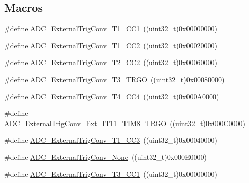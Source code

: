 \subsection*{Macros}
\begin{DoxyCompactItemize}
\item 
\#define \hyperlink{group___a_d_c__external__trigger__sources__for__regular__channels__conversion_ga303f24361ea930f8214e9e68b63b244e}{A\+D\+C\+\_\+\+External\+Trig\+Conv\+\_\+\+T1\+\_\+\+C\+C1}~((uint32\+\_\+t)0x00000000)
\item 
\#define \hyperlink{group___a_d_c__external__trigger__sources__for__regular__channels__conversion_ga8bf9fd9ad4e4c12ef41520ded2c3c332}{A\+D\+C\+\_\+\+External\+Trig\+Conv\+\_\+\+T1\+\_\+\+C\+C2}~((uint32\+\_\+t)0x00020000)
\item 
\#define \hyperlink{group___a_d_c__external__trigger__sources__for__regular__channels__conversion_gadfeb40c1735b0ee50f8a5aafdd840cc6}{A\+D\+C\+\_\+\+External\+Trig\+Conv\+\_\+\+T2\+\_\+\+C\+C2}~((uint32\+\_\+t)0x00060000)
\item 
\#define \hyperlink{group___a_d_c__external__trigger__sources__for__regular__channels__conversion_ga1cf4549534a00fe2f5527ad783204098}{A\+D\+C\+\_\+\+External\+Trig\+Conv\+\_\+\+T3\+\_\+\+T\+R\+GO}~((uint32\+\_\+t)0x00080000)
\item 
\#define \hyperlink{group___a_d_c__external__trigger__sources__for__regular__channels__conversion_ga8f6a764b7de878c2e09bbb0d1061d69c}{A\+D\+C\+\_\+\+External\+Trig\+Conv\+\_\+\+T4\+\_\+\+C\+C4}~((uint32\+\_\+t)0x000\+A0000)
\item 
\#define \hyperlink{group___a_d_c__external__trigger__sources__for__regular__channels__conversion_ga640de59aeac8cc3d96b6db3497975d02}{A\+D\+C\+\_\+\+External\+Trig\+Conv\+\_\+\+Ext\+\_\+\+I\+T11\+\_\+\+T\+I\+M8\+\_\+\+T\+R\+GO}~((uint32\+\_\+t)0x000\+C0000)
\item 
\#define \hyperlink{group___a_d_c__external__trigger__sources__for__regular__channels__conversion_ga41ad03e2921f6de0fb75ae06d6046e63}{A\+D\+C\+\_\+\+External\+Trig\+Conv\+\_\+\+T1\+\_\+\+C\+C3}~((uint32\+\_\+t)0x00040000)
\item 
\#define \hyperlink{group___a_d_c__external__trigger__sources__for__regular__channels__conversion_ga433a3845ed1792fa6359b763c955e9c2}{A\+D\+C\+\_\+\+External\+Trig\+Conv\+\_\+\+None}~((uint32\+\_\+t)0x000\+E0000)
\item 
\#define \hyperlink{group___a_d_c__external__trigger__sources__for__regular__channels__conversion_ga3c73d5c8bb0f898dbbc74bcc536f6ec1}{A\+D\+C\+\_\+\+External\+Trig\+Conv\+\_\+\+T3\+\_\+\+C\+C1}~((uint32\+\_\+t)0x00000000)

\end{DoxyCompactItemize}
